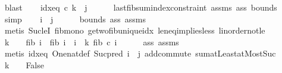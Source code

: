 \begin{isabellebody}
\ blast\isanewline
\ \ \isamarkupfalse%
\ idx{\isacharunderscore}{\kern0pt}eq{\isacharcolon}{\kern0pt}\ {\isachardoublequoteopen}c\ k\ {\isacharequal}{\kern0pt}\ j{\isachardoublequoteclose}\isanewline
\ \ \ \ \isamarkupfalse%
\ last{\isacharunderscore}{\kern0pt}fib{\isacharunderscore}{\kern0pt}sum{\isacharunderscore}{\kern0pt}index{\isacharunderscore}{\kern0pt}constraint\ assms{\isacharparenleft}{\kern0pt}{}{\isacharminus}{\kern0pt}{}{\isacharparenright}{\kern0pt}\ ass\ bounds\ \isamarkupfalse%
\ simp\isanewline
\ \ \isamarkupfalse%
\ {\isachardoublequoteopen}i\ {\isacharequal}{\kern0pt}\ j{\isachardoublequoteclose}\isanewline
\ \ \ \ \isamarkupfalse%
\ bounds\ ass\ assms\ \isanewline
\ \ \ \ \isamarkupfalse%
\ {\isacharparenleft}{\kern0pt}metis\ Suc{\isacharunderscore}{\kern0pt}leI\ fib{\isacharunderscore}{\kern0pt}mono\ ge{\isacharunderscore}{\kern0pt}two{\isacharunderscore}{\kern0pt}fib{\isacharunderscore}{\kern0pt}unique{\isacharunderscore}{\kern0pt}idx\ le{\isacharunderscore}{\kern0pt}neq{\isacharunderscore}{\kern0pt}implies{\isacharunderscore}{\kern0pt}less\ linorder{\isacharunderscore}{\kern0pt}not{\isacharunderscore}{\kern0pt}le{\isacharparenright}{\kern0pt}\isanewline
\ \ \isamarkupfalse%
\ {\isachardoublequoteopen}k\ {\isachargreater}{\kern0pt}\ {}\ {\isasymlongrightarrow}\ fib\ i\ {\isacharequal}{\kern0pt}\ fib\ i\ {\isacharplus}{\kern0pt}\ {\isacharparenleft}{\kern0pt}{\isasymSum}i\ {\isacharequal}{\kern0pt}\ {}{\isachardot}{\kern0pt}{\isachardot}{\kern0pt}k{\isacharminus}{\kern0pt}{}{\isachardot}{\kern0pt}\ fib\ {\isacharparenleft}{\kern0pt}c\ i{\isacharparenright}{\kern0pt}{\isacharparenright}{\kern0pt}{\isachardoublequoteclose}\isanewline
\ \ \ \ \isamarkupfalse%
\ ass\ assms\ \isamarkupfalse%
\ {\isacharparenleft}{\kern0pt}metis\ idx{\isacharunderscore}{\kern0pt}eq\ One{\isacharunderscore}{\kern0pt}nat{\isacharunderscore}{\kern0pt}def\ Suc{\isacharunderscore}{\kern0pt}pred\ {\isacartoucheopen}i\ {\isacharequal}{\kern0pt}\ j{\isacartoucheclose}\ add{\isachardot}{\kern0pt}commute\ sum{\isachardot}{\kern0pt}atLeast{}{\isacharunderscore}{\kern0pt}atMost{\isacharunderscore}{\kern0pt}Suc{\isacharparenright}{\kern0pt}\isanewline
\ \ \isamarkupfalse%
\ {\isachardoublequoteopen}k\ {\isachargreater}{\kern0pt}\ {}\ {\isasymlongrightarrow}\ False{\isachardoublequoteclose}\isanewline
\ \ \ \ \isamarkupfalse%

\end{isabellebody}
